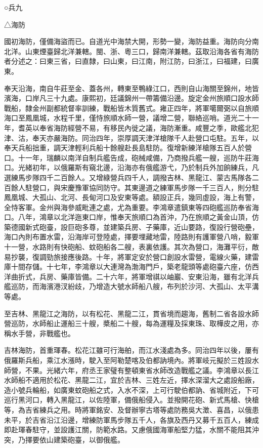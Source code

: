 
\begin{pinyinscope}
○兵九

△海防

國初海防，僅備海盜而已。自道光中海禁大開，形勢一變，海防益重。海防向分南北洋。山東煙臺歸北洋兼轄。閩、浙、粵三口，歸南洋兼轄。茲取沿海各省有海防者分述之：曰東三省，曰直隸，曰山東，曰江南，附江防，曰浙江，曰福建，曰廣東。

奉天沿海，南自牛莊至金、蓋各州，轉東至鴨綠江口，西則自山海關至錦州，地皆濱海，口岸凡三十九處。康熙初，廷議錦州一帶籌備沿邊。旋定金州旅順口設水師戰船，隸金州副都統督率訓練，戰船皆木質舊式。雍正四年，將軍噶爾弼以自旅順海口至鳳凰城，水程千里，僅恃旅順水師一營，議增二營，聯絡巡哨。道光二十一年，耆英以奉省海防經營不易，有移民內徙之議，海防漸重。咸豐之季，歐艦北犯津、沽，奉天亦嚴海防。同治四年，崇厚調天津洋槍隊千人赴營口屯駐。五年，以奉天兵船拙重，調天津輕利兵船十餘艘赴長島駐防。復增新練洋槍隊五百人於營口。十一年，瑞麟以南洋自制兵艦告成，砲械咸備，乃商撥兵艦一艘，巡防牛莊海口。光緒初年，以俄羅斯有窺北邊，沿海亦有俄艦游弋，乃於制兵外加餉練兵，凡選練馬步隊四千二百餘人。又增綠營兵四千人，調撥吉林、黑龍江、蒙古馬隊各二百餘人駐營口，與宋慶豫軍協同防守。其東邊道之練軍馬步隊一千三百人，則分駐鳳凰城、大孤山、北河、長甸河口及安東等處。額設正兵，幾同虛設，海上有警，全恃客軍。金州與海參威毗連之處，尤為重要。李鴻章遣鎮東等四砲艦巡防奉省海口。八年，鴻章以北洋迤東口岸，惟奉天旅順口為首沖，乃在旅順之黃金山頂，仿築德國新式砲臺，設巨砲多尊，並建築兵房、子藥庫，近山要路，復設行營砲壘，海口內則布置水雷，沿海岸可登陸處，擇要埋藏地雷，陸路則有護軍營八哨，毅軍十一營，水路則有快砲船、蚊砲船各二艘，表裏依護。其次為營口，海灘平衍，敵易抄襲，復調勁旅接應後路。十年，將軍定安於營口創設水雷營，電線火藥，建雷庫十間存儲。十七年，李鴻章以大連灣為渤海門戶，築老龍頭等處砲臺六座，仿西洋曲折式，兵房、藥庫皆備。二十六年，將軍增祺以岫巖、安東沿海，雖有北洋兵艦巡防，而海濱港汊紛歧，乃增造大號水師船八艘，布列於沙河、大孤山、太平溝等處。

至吉林、黑龍江之海防，以有松花、黑龍二江，貫省境而趨海，舊制二省各設水師營巡防，水師船止運船三十艘，槳船二十艘，每為運糧及採東珠、取樺皮之用，亦稱水手營，非戰艦也。

吉林海防，首重琿春。松花江雖可行海舶，而江水淺處為多。同治四年以後，屢有俄羅斯兵船，乘江水漲時，駛入至阿勒楚喀及伯都訥境內。將軍岐元擬於三姓設水師營，不果。光緒六年，府丞王家璧有整頓東省水師改造戰艦之議。李鴻章以長江水師船不適用於松花、黑龍二江，宜於吉林、三姓左近，擇水深溜大之處設船廠，造小號兵輪船，如廣東蚊砲船之式，入水不深，上可行駛伯都訥、省城附近，下可巡行黑河口，轉入黑龍江，以佐陸軍，備俄船侵入。並撥開花砲、新式馬槍、快槍等，為吉省練兵之用。時將軍銘安、及督辦寧古塔等處防務吳大澂、喜昌，以俄患未平，於吉省沿江沿邊，增練防軍馬步隊五千人，各旗及西丹又募千五百人，練成即赴琿春駐守，並設護江關，防範水路。又慮俄國海軍船堅力猛，水關不能阻其沖突，乃擇要依山建築砲臺，以御俄艦。


\end{pinyinscope}
